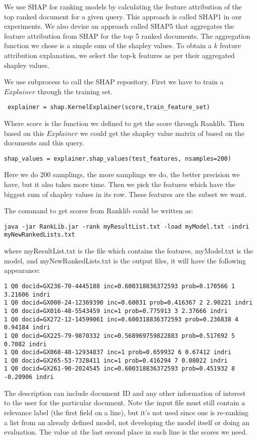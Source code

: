 We use SHAP for ranking models by calculating the feature attribution of the top ranked document for a given query. This approach is called \textsc{SHAP1} in our experiments. We also devise an approach called \textsc{SHAP5} that aggregates the feature attribution from SHAP for the top 5 ranked documents. The aggregation function we chose is a simple sum of the shapley values. To obtain a $k$ feature attribution explanation, we select the top-k features as per their aggregated shapley values. 

We use subprocess to call the SHAP repository. First we have to train a $Explainer$ through the training set. 
\begin{lstlisting}
 explainer = shap.KernelExplainer(score,train_feature_set)
\end{lstlisting}
Where $score$ is the function we defined to get the score through Ranklib.
Then based on this $Explainer$ we could get the shapley value matrix of based on the documents and this query.
\begin{lstlisting}
shap_values = explainer.shap_values(test_features, nsamples=200)
\end{lstlisting}
Here we do 200 samplings, the more samplings we do, the better precision we have, but it also takes more time. 
Then we pick the features which have the biggest sum of shapley values in its row. These features are the subset we want.  

The command to get scores from Ranklib could be written as:
\begin{lstlisting}
java -jar RankLib.jar -rank myResultList.txt -load myModel.txt -indri myNewRankedLists.txt
\end{lstlisting}
where myResultList.txt is the file which contains the features, myModel.txt is the model, and myNewRankedLists.txt is the output files, it will have the following appearance:
\begin{lstlisting}
1 Q0 docid=GX236-70-4445188 inc=0.600318836372593 prob=0.170566 1 3.21606 indri
1 Q0 docid=GX000-24-12369390 inc=0.60031 prob=0.416367 2 2.90221 indri
1 Q0 docid=GX016-48-5543459 inc=1 prob=0.775913 3 2.37666 indri
1 Q0 docid=GX272-12-14599061 inc=0.600318836372593 prob=0.236838 4 0.94184 indri
1 Q0 docid=GX225-79-9870332 inc=0.568969759822883 prob=0.517692 5 0.7082 indri
1 Q0 docid=GX068-48-12934837 inc=1 prob=0.659932 6 0.67412 indri
1 Q0 docid=GX265-53-7328411 inc=1 prob=0.416294 7 0.08022 indri
1 Q0 docid=GX261-90-2024545 inc=0.600318836372593 prob=0.451932 8 -0.20906 indri
\end{lstlisting}
The description can include document ID and any other information of interest to the user for the particular document. Note the input file must still contain a relevance label (the first field on a line), but it's not used since one is re-ranking a list from an already defined model, not developing the model itself or doing an evaluation. The value at the last second place in each line is the scores we need.

